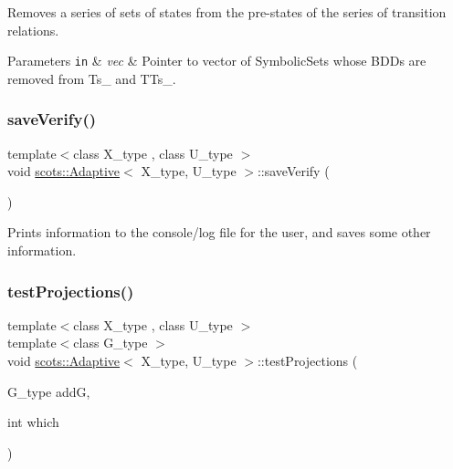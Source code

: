 Removes a series of sets of states from the pre-\/states of the series of transition relations. 
\begin{DoxyParams}[1]{Parameters}
\mbox{\tt in}  & {\em vec} & Pointer to vector of Symbolic\+Sets whose B\+D\+Ds are removed from Ts\+\_\+ and T\+Ts\+\_\+. \\
\hline
\end{DoxyParams}
\mbox{\label{classscots_1_1Adaptive_ab1d6eeb4c4b6ec88e7e6a283a7dfd57d}} 
\subsubsection{\texorpdfstring{save\+Verify()}{saveVerify()}}
{\footnotesize\ttfamily template$<$class X\+\_\+type , class U\+\_\+type $>$ \\
void \hyperlink{classscots_1_1Adaptive}{scots\+::\+Adaptive}$<$ X\+\_\+type, U\+\_\+type $>$\+::save\+Verify (\begin{DoxyParamCaption}{ }\end{DoxyParamCaption})\hspace{0.3cm}{\ttfamily [inline]}}

Prints information to the console/log file for the user, and saves some other information. \mbox{\label{classscots_1_1Adaptive_a9a715bff15ed2365485cca7818c71479}} 
\subsubsection{\texorpdfstring{test\+Projections()}{testProjections()}}
{\footnotesize\ttfamily template$<$class X\+\_\+type , class U\+\_\+type $>$ \\
template$<$class G\+\_\+type $>$ \\
void \hyperlink{classscots_1_1Adaptive}{scots\+::\+Adaptive}$<$ X\+\_\+type, U\+\_\+type $>$\+::test\+Projections (\begin{DoxyParamCaption}\item[{G\+\_\+type}]{addG,  }\item[{int}]{which }\end{DoxyParamCaption})\hspace{0.3cm}{\ttfamily [inline]}}


